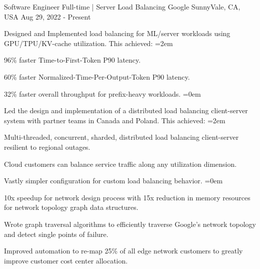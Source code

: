 
\begin{cventries}
  \cventry
    {Software Engineer Full-time | Server Load Balancing} %
    {Google} %
    {SunnyVale, CA, USA} %
    {Aug 29, 2022 - Present} %
    {
      \begin{cvitems} %
        \item {Designed and Implemented load balancing for ML/server workloads
          using GPU/TPU/KV-cache utilization. This achieved:}
        \itemindent=2em
          \item {96\% faster Time-to-First-Token P90 latency.}
          \item {60\% faster Normalized-Time-Per-Output-Token P90 latency.}
          \item {32\% faster overall throughput for prefix-heavy workloads.}
        \itemindent=0em
        \item {Led the design and implementation of a distributed load balancing
          client-server system with partner teams in Canada and Poland. This
          achieved:}
        \itemindent=2em
        \item {Multi-threaded, concurrent, sharded, distributed load
          balancing client-server resilient to regional outages.}
        \item {Cloud customers can balance service traffic along any
          utilization dimension.}
        \item {Vastly simpler configuration for custom load balancing behavior.}
        \itemindent=0em
        \item {10x speedup for network design process with 15x reduction in
          memory resources for network topology graph data structures.}
        \item {Wrote graph traversal algorithms to efficiently traverse Google's
          network topology and detect single points of failure.}
        \item {Improved automation to re-map 25\% of all edge network customers
          to greatly improve customer cost center allocation.}
      \end{cvitems}
    }


\end{cventries}
